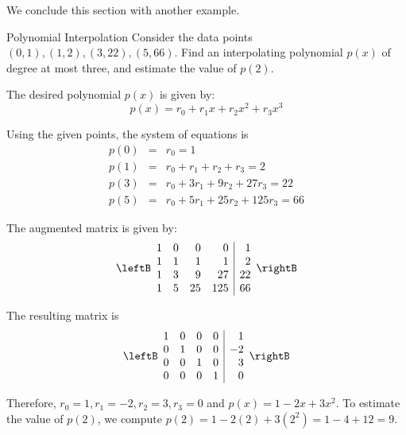 We conclude this section with another example. 

\begin{example}{Polynomial Interpolation}\label{exa:polynomialinterpolation2}
Consider the data points $(0,1), (1,2), (3,22), (5,66)$. Find an interpolating polynomial $p(x)$ of degree at most three, and estimate the value of $p(2)$. 
\end{example}

\begin{solution}
The desired polynomial $p(x)$ is given by:
\[
p(x) = r_0 + r_1 x + r_2x^2 + r_3x^3
\]

Using the given points, the system of equations is
\begin{eqnarray*}
p(0) &=& r_0 = 1 \\
p(1) &=& r_0 + r_1 + r_2 + r_3 = 2 \\
p(3) &=& r_0 + 3r_1 + 9r_2 + 27r_3 = 22 \\
p(5) &=& r_0 + 5r_1 + 25r_2 + 125r_3 = 66
\end{eqnarray*}

The augmented matrix is given by:
\[
\leftB
\begin{array}{rrrr|r}
1 & 0 & 0 & 0 & 1 \\
1 & 1 & 1 & 1 & 2 \\
1 & 3 & 9 & 27 & 22 \\
1 & 5 & 25 & 125 & 66
\end{array}
\rightB
\]

The resulting matrix is 
\[
\leftB
\begin{array}{rrrr|r}
1 & 0 & 0 & 0 & 1 \\
0 & 1 & 0 & 0 & -2 \\
0 & 0 & 1 & 0 & 3 \\
0 & 0 & 0 & 1 & 0
\end{array}
\rightB
\]

Therefore, $r_0 = 1, r_1 = -2, r_2 = 3, r_3 = 0$ and $p(x) = 1 -2x + 3x^2$. To estimate the value of $p(2)$, we compute $p(2) = 1 -2(2) + 3(2^2) = 1 - 4 + 12 = 9$.
\end{solution}